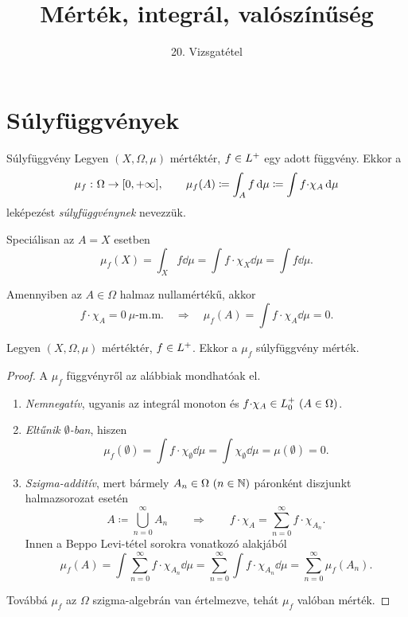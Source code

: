 \documentclass[
]{elteikthesis}[2024/04/26]
\title{Mérték, integrál, valószínűség} %
\subtitle{20. Vizsgatétel}
\begin{document}
	
	
	\section{Súlyfüggvények}
	
	\begin{definition}{Súlyfüggvény}{}
		Legyen \( (X, \Omega, \mu) \) mértéktér, 
		\( f \in L^+ \) egy adott függvény. Ekkor a
		\[
			\mu_f \,\colon \Omega \to [0, +\infty], \qquad 
			\mu_f(A) \coloneq 
			\int_A f \mathop{}\!\mathrm{d}{\mu} \coloneq 
			\int f {\cdot} \chi_A \mathop{}\!\mathrm{d}{\mu}
		\]
		leképezést \emph{súlyfüggvénynek} nevezzük.
	\end{definition}
	
	\begin{notes}
		\item
		Speciálisan az \( A = X \) esetben
		\[
			\mu_f(X) = 
			\int_X f \dd{\mu} = 
			\int f {\cdot} \chi_X \dd{\mu} = 
			\int f \dd{\mu}.
		\]
		
		\item Amennyiben az \( A \in \Omega \) halmaz nullamértékű, akkor
		\[
			f {\cdot} \chi_A = 0 \ \mu \text{-m.m.}
			\quad \Longrightarrow \quad
			\mu_f(A) = 
			\int f {\cdot} \chi_A \dd{\mu} =
			0.
		\]
	\end{notes}
	
	\begin{statement}{}{}
		Legyen \( (X, \Omega, \mu) \) mértéktér, \( f \in L^+ \).
		Ekkor a \( \mu_f \) súlyfüggvény mérték.
	\end{statement}
	\begin{proof}
		A \( \mu_f \) függvényről az alábbiak mondhatóak el.
		\begin{enumerate}
			\item
			\emph{Nemnegatív}, ugyanis az integrál monoton 
			és \( f {\cdot} \chi_A \in \StepFuncPos \ (A \in \Omega) \).
			
			\item
			\emph{Eltűnik \( \emptyset \)-ban}, hiszen
			\[
				\mu_f( \emptyset ) = 
				\int f {\cdot} \chi_\emptyset \dd{\mu} = 
				\int \chi_\emptyset \dd{\mu} = 
				\mu( \emptyset ) =
				0.
			\]
			
			\item
			\emph{Szigma-additív}, mert bármely \( A_n \in \Omega \ (n \in \mathbb{N}) \)
			páronként diszjunkt halmazsorozat esetén
			\[
				A \coloneq \bigcup_{n=0}^{\infty} A_n
				\qquad \Longrightarrow \qquad
				f {\cdot} \chi_A = \sum_{n=0}^{\infty} f {\cdot} \chi_{A_n}.
			\]
			Innen a Beppo Levi-tétel sorokra vonatkozó alakjából
			\[
				\mu_f(A) = 
				\int \sum_{n=0}^{\infty} f {\cdot} \chi_{A_n} \dd{\mu} =
				\sum_{n=0}^{\infty} \int f {\cdot} \chi_{A_n} \dd{\mu} =
				\sum_{n=0}^{\infty} \mu_f(A_n).
			\]
		\end{enumerate}
		Továbbá \( \mu_f \) az \( \Omega \) szigma-algebrán van értelmezve, 
		tehát \( \mu_f \) valóban mérték.
	\end{proof}
	
\end{document}
